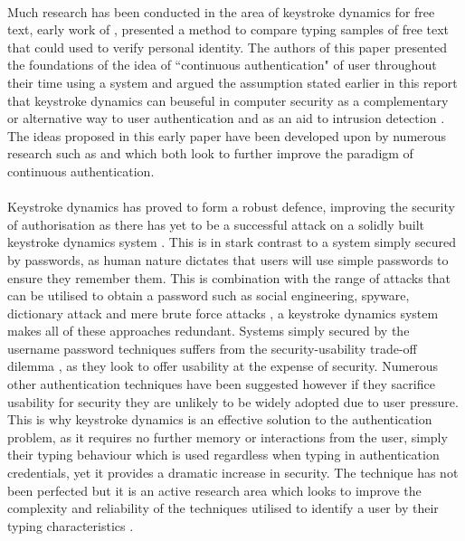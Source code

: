 \documentclass{article}
\begin{document}
\paragraph{}
Much research has been conducted in the area of keystroke dynamics for free text, early work of \parencite{Gunetti:2005}, presented a method to compare typing samples of free text that could used to verify personal identity. The authors of this paper  presented the foundations of the idea of ``continuous authentication" of user throughout their time using a system and argued the assumption stated earlier in this report  that keystroke dynamics can beuseful in computer security as a complementary or alternative way to user authentication and as an aid to intrusion detection \parencite{Gunetti:2005}. The ideas proposed in this early paper have been developed upon by numerous research such as \parencite{contFreeText} and \parencite{sznur2015advances} which both look to further improve the paradigm of continuous authentication. 

\paragraph{}
Keystroke dynamics has proved to form a robust defence, improving the security of authorisation as there has yet to be a successful attack on a solidly built keystroke dynamics system \parencite{sznur2015advances}. This is in stark contrast to a system simply secured by passwords, as human nature dictates that users will use simple passwords to ensure they remember them. This is combination with the range of attacks that can be utilised to obtain a password such as social engineering, spyware, dictionary attack and mere brute force attacks \parencite{alsultan2013keystroke}, a keystroke dynamics system makes all of these approaches redundant. Systems simply secured by the username password techniques suffers from the security-usability trade-off dilemma \parencite{alsultan2013keystroke}, as they look to offer usability at the expense of security. Numerous other authentication techniques have been suggested however if they sacrifice usability for security they are unlikely to be widely adopted due to user pressure. This is why keystroke dynamics is an effective solution to the authentication problem, as it requires no further memory or interactions from the user, simply their typing behaviour which is used regardless when typing in authentication credentials, yet it provides a dramatic increase in security. The technique has not been perfected but it is an active research area which looks to improve the complexity and reliability of the techniques utilised to identify a user by their typing characteristics \parencite{sznur2015advances}. 
\end{document}
